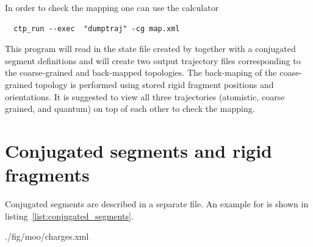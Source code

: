 In order to check the mapping one can use the \dumptraj calculator
\begin{verbatim}
  ctp_run --exec  "dumptraj" -cg map.xml 
\end{verbatim}

This program will read in the state file created by \ctpmap together with a conjugated segment definitions and will create two output trajectory files corresponding to the coarse-grained and back-mapped topologies. The back-maping of the coase-grained topology is performed using stored rigid fragment positions and orientations. It is suggested to view all three trajectories (atomistic, coarse grained, and quantum) on top of each other to check the mapping.

\section{Conjugated segments and rigid fragments}

Conjugated segments are described in a separate \xml file. An example for \dcvt is shown in listing~\ref{list:conjugated_segments}.


%
{./fig/moo/charges.xml}

\noindent
{}

